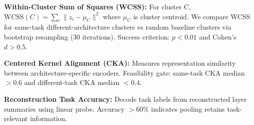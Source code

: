 \textbf{Within-Cluster Sum of Squares (WCSS):} For cluster C, $\text{WCSS}(C) = \sum_i \|z_i - \mu_C\|^2$ where $\mu_C$ is cluster centroid. We compare WCSS for same-task different-architecture clusters vs random baseline clusters via bootstrap resampling (30 iterations). Success criterion: $p < 0.01$ and Cohen's $d > 0.5$.

\textbf{Centered Kernel Alignment (CKA):} Measures representation similarity between architecture-specific encoders. Feasibility gate: same-task CKA median $> 0.6$ and different-task CKA median $< 0.4$.

\textbf{Reconstruction Task Accuracy:} Decode task labels from reconstructed layer summaries using linear probe. Accuracy $> 60\%$ indicates pooling retains task-relevant information.

